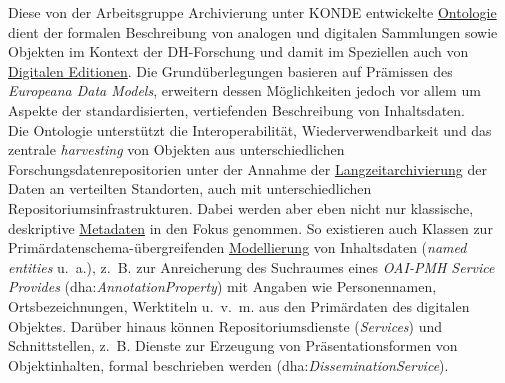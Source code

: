 \documentclass{article}
\begin{document}
    Diese von der Arbeitsgruppe Archivierung unter KONDE entwickelte \href{http://gams.uni-graz.at/o:konde.151}{Ontologie} dient der formalen Beschreibung von analogen und digitalen Sammlungen sowie Objekten im Kontext der DH-Forschung und damit im Speziellen auch von \href{http://gams.uni-graz.at/o:konde.59}{Digitalen Editionen}. Die Grundüberlegungen basieren auf Prämissen des \emph{Europeana Data Models}, erweitern dessen Möglichkeiten jedoch vor allem um Aspekte der standardisierten, vertiefenden Beschreibung von Inhaltsdaten.\\
            
        Die Ontologie unterstützt die Interoperabilität, Wiederverwendbarkeit und das zentrale \emph{harvesting} von Objekten aus unterschiedlichen Forschungsdatenrepositorien unter der Annahme der \href{http://gams.uni-graz.at/o:konde.6}{Langzeitarchivierung} der Daten an verteilten Standorten, auch mit unterschiedlichen Repositoriumsinfrastrukturen. Dabei werden aber eben nicht nur klassische, deskriptive \href{http://gams.uni-graz.at/o:konde.25}{Metadaten} in den Fokus genommen. So existieren auch Klassen zur Primärdatenschema-übergreifenden \href{http://gams.uni-graz.at/o:konde.137}{Modellierung} von Inhaltsdaten (\emph{named entities} u. a.), z. B. zur Anreicherung des Suchraumes eines \emph{OAI-PMH Service Provides} (dha:\emph{AnnotationProperty}) mit Angaben wie Personennamen, Ortsbezeichnungen, Werktiteln u. v. m. aus den Primärdaten des digitalen Objektes. Darüber hinaus können Repositoriumsdienste (\emph{Services}) und Schnittstellen, z. B. Dienste zur Erzeugung von Präsentationsformen von Objektinhalten, formal beschrieben werden (dha:\emph{DisseminationService}).\\
            
\end{document}
